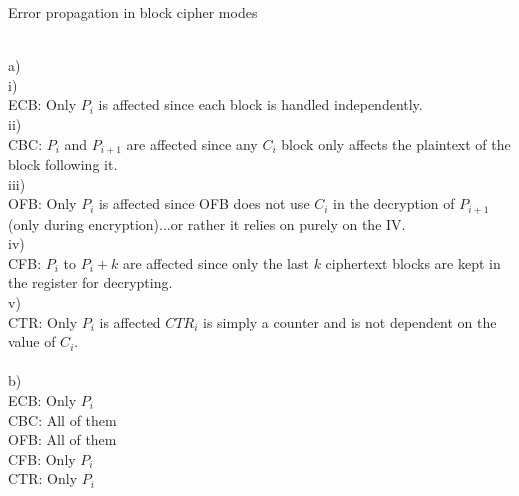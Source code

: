 \documentclass{assignment}
\begin{document}
\begin{problemlist}
\pbitem Error propagation in block cipher modes
\begin{problem}
\begin{answer}
\\
a)\\
i)\\
ECB: Only $P_i$ is affected since each block is handled independently.\\
ii)\\
CBC: $P_i$ and $P_{i+1}$ are affected since any $C_i$ block only affects the plaintext of the block following it.\\
iii)\\
OFB: Only $P_i$ is affected since OFB does not use $C_i$ in the decryption of $P_{i+1}$ (only during encryption)...or rather it relies on purely on the IV.\\
iv)\\
CFB: $P_i$ to $P_i+k$ are affected since only the last $k$ ciphertext blocks are kept in the register for decrypting.\\
v)\\
CTR: Only $P_i$ is affected $CTR_i$ is simply a counter and is not dependent on the value of $C_i$.\\
\\
b)\\
ECB: Only $P_i$\\
CBC: All of them\\
OFB: All of them\\
CFB: Only $P_i$\\
CTR: Only $P_i$\\
\\
\end{answer}
\end{problem}

\end{problemlist}
\end{document}
